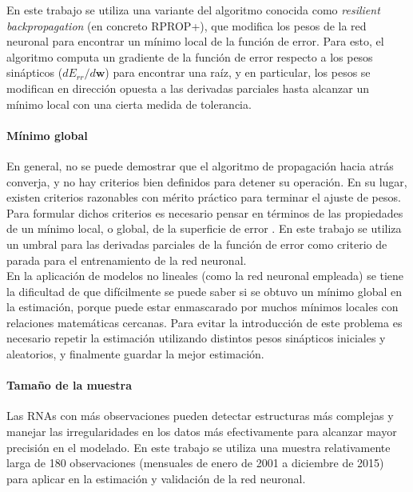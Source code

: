 En este trabajo se utiliza una variante del algoritmo conocida como \textit{resilient backpropagation} (en concreto RPROP+), que modifica los pesos de la red neuronal para encontrar un mínimo local de la función de error. Para esto, el algoritmo computa un gradiente de la función de error respecto a los pesos sinápticos ($dE_{rr}/d\mathbf{w}$) para encontrar una raíz, y en particular, los pesos se modifican en dirección opuesta a las derivadas parciales hasta alcanzar un mínimo local con una cierta medida de tolerancia.

\paragraph{Mínimo global}
En general, no se puede demostrar que el algoritmo de propagación hacia atrás converja, y no hay criterios bien definidos para detener su operación. En su lugar, existen criterios razonables con mérito práctico para terminar el ajuste de pesos. Para formular dichos criterios es necesario pensar en términos de las propiedades de un mínimo local, o global, de la superficie de error \parencite{haykin1999neural}. En este trabajo se utiliza un umbral para las derivadas parciales de la función de error como criterio de parada para el entrenamiento de la red neuronal.\\

En la aplicación de modelos no lineales (como la red neuronal empleada) se tiene la dificultad de que difícilmente se puede saber si se obtuvo un mínimo global en la estimación, porque puede estar enmascarado por muchos mínimos locales con relaciones matemáticas cercanas. Para evitar la introducción de este problema es necesario repetir la estimación utilizando distintos pesos sinápticos iniciales y aleatorios, y finalmente guardar la mejor estimación.



\paragraph{Tamaño de la muestra}
Las RNAs con más observaciones pueden detectar estructuras más complejas y manejar las irregularidades en los datos más efectivamente para alcanzar mayor precisión en el modelado. En este trabajo se utiliza una muestra relativamente larga de 180 observaciones (mensuales de enero de 2001 a diciembre de 2015) para aplicar en la estimación y validación de la red neuronal.



